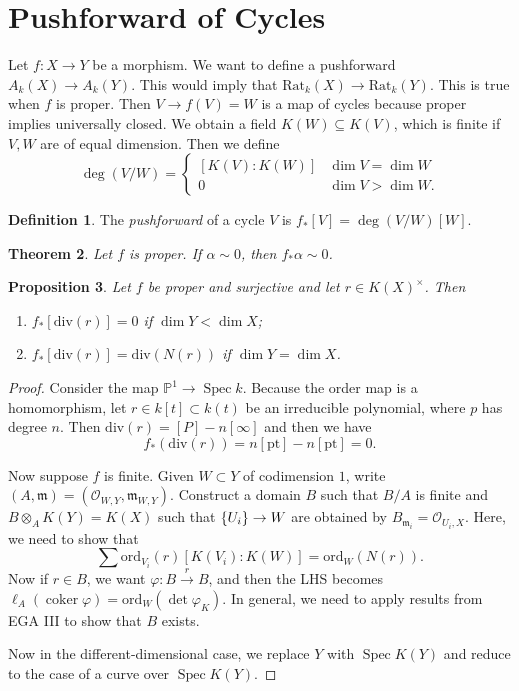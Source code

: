 \documentclass[leqno, openany]{memoir}
\newtheorem{thm}{Theorem}[section]
\newtheorem{prop}[thm]{Proposition}
\theoremstyle{definition}
\newtheorem{defn}[thm]{Definition}
\theoremstyle{remark}
\theoremstyle{plain}
\theoremstyle{definition}
\theoremstyle{remark}
\renewcommand{\P}{\mathbb{P}}
\newcommand{\mc}[1]{\mathcal{#1}}
\newcommand{\mf}[1]{\mathfrak{#1}}
\newcommand{\mr}[1]{\mathrm{#1}}
\DeclareMathOperator{\Spec}{Spec}
\begin{document}
\section{Pushforward of Cycles}%
\label{sec:pushforward_of_cycles}

Let $f \colon X \to Y$ be a morphism. We want to define a pushforward $A_k(X) \to A_k(Y)$. This would imply that $\mr{Rat}_k(X) \to \mr{Rat}_k(Y)$. This is true when $f$ is proper. Then $V \to f(V) = W$ is a map of cycles because proper implies universally closed. We obtain a field $K(W) \subseteq K(V)$, which is finite if $V,W$ are of equal dimension. Then we define
\[ \deg(V/W) = \begin{cases}
    [K(V) : K(W)] & \dim V = \dim W \\
    0 & \dim V > \dim W.
\end{cases} \]

\begin{defn}
    The \textit{pushforward}  of a cycle $V$ is $f_* [V] = \deg(V/W) [W]$.
\end{defn}

\begin{thm}
    Let $f$ is proper. If $\alpha \sim 0$, then $f_* \alpha \sim 0$.
\end{thm}

\begin{prop}
    Let $f$ be proper and surjective and let $r \in {K(X)}^{\times}$. Then
    \begin{enumerate}
        \item $f_* [ \mr{div}(r) ] = 0$ if $\dim Y < \dim X$;
        \item $f_* [\mr{div}(r)] = \mr{div}(N(r))$ if $\dim Y = \dim X$.
    \end{enumerate}
\end{prop}

\begin{proof}
    Consider the map $\P^1 \to \Spec k$. Because the order map is a homomorphism, let $r \in k[t] \subset k(t)$ be an irreducible polynomial, where $p$ has degree $n$. Then $\mr{div}(r) = [P] - n [\infty]$ and then we have
    \[ f_* (\mr{div}(r)) = n[\mr{pt}] - n [\mr{pt}] = 0. \]

    Now suppose $f$ is finite. Given $W \subset Y$ of codimension $1$, write $(A, \mf{m}) = (\mc{O}_{W,Y}, \mf{m}_{W,Y})$. Construct a domain $B$ such that $B/A$ is finite and $B \otimes_A K(Y) = K(X)$ such that $\qty{U_i} \to W$ are obtained by $B_{\mf{m}_i} = \mc{O}_{U_i, X}$. Here, we need to show that
    \[ \sum \mr{ord}_{V_i}(r) [K(V_i) \colon K(W)] = \mr{ord}_W(N(r)). \]
    Now if $r \in B$, we want $\varphi \colon B \xrightarrow{r} B$, and then the LHS becomes $\ell_A(\operatorname{coker} \varphi) = \mr{ord}_W(\det \varphi_K)$. In general, we need to apply results from EGA III to show that $B$ exists.

    Now in the different-dimensional case, we replace $Y$ with $\Spec K(Y)$ and reduce to the case of a curve over $\Spec K(Y)$.
\end{proof}
\end{document}
